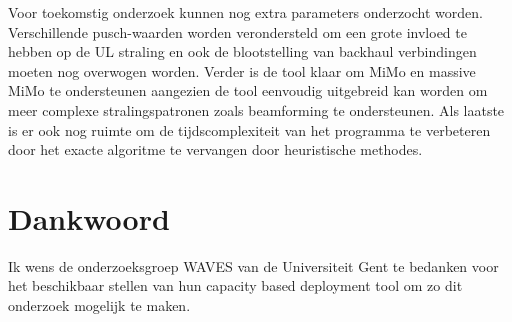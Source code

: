 \documentclass[twocolumn]{phdsymp_dutch}
\begin{document}
Voor toekomstig onderzoek kunnen nog extra parameters onderzocht worden. Verschillende 
 \gls{pusch}-waarden worden verondersteld om een grote invloed te hebben op de 
 \gls{UL} straling en ook de blootstelling van  
backhaul verbindingen moeten nog overwogen worden.
Verder is de tool klaar om MiMo en massive MiMo te ondersteunen aangezien 
de tool eenvoudig uitgebreid kan worden om meer complexe stralingspatronen zoals beamforming te ondersteunen.
Als laatste is er ook nog ruimte om de tijdscomplexiteit van het programma te verbeteren door het exacte algoritme 
te vervangen door heuristische methodes. 


\section*{Dankwoord}

Ik wens de onderzoeksgroep WAVES van de Universiteit Gent te bedanken voor 
het beschikbaar stellen van hun capacity based deployment tool om zo dit onderzoek mogelijk te maken.



\end{document}
